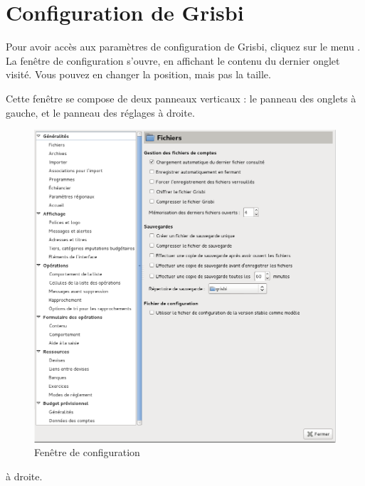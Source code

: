 
\chapter{Configuration de Grisbi\label{setup}}


Pour avoir accès aux paramètres de configuration de Grisbi, cliquez sur le menu . La fenêtre de configuration s'ouvre, en affichant le contenu du dernier onglet visité. Vous pouvez en changer la position, mais pas la taille. 

Cette fenêtre se compose de deux panneaux verticaux : le panneau des onglets à gauche, et le panneau des réglages \ifIllustration à droite.

\begin{figure}[htbp]
\begin{center}
\includegraphics[scale=0.42]{image/screenshot/setup_sections}
\end{center}
\caption{Fenêtre de configuration}
\label{setup-sections-img}
\end{figure}
\else à droite.
\fi

